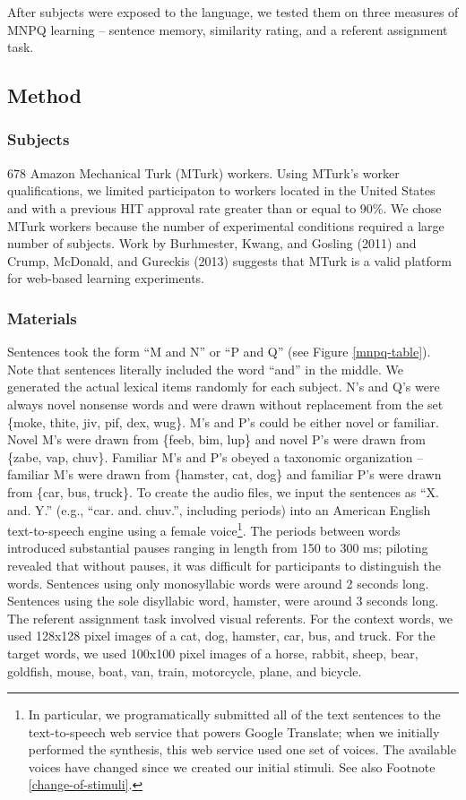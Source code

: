 \documentclass[man,floatsintext]{apa6}
\begin{document}
After subjects were exposed to the language, we tested them on three
measures of MNPQ learning -- sentence memory, similarity rating, and a
referent assignment task.

\subsection{Method}

\subsubsection{Subjects}
678 Amazon Mechanical Turk (MTurk) workers. Using MTurk's worker
qualifications, we limited participaton to workers located in the
United States and with a previous HIT approval rate greater than or
equal to 90\%. We chose MTurk workers because the number of
experimental conditions required a large number of subjects. Work by
Burhmester, Kwang, and Gosling (2011) and Crump, McDonald, and
Gureckis (2013) suggests that MTurk is a valid platform for web-based
learning experiments.

\subsubsection{Materials}
Sentences took the form ``M and N'' or ``P and Q'' (see Figure
\ref{mnpq-table}). Note that sentences literally included the word
``and'' in the middle. We generated the actual lexical items randomly
for each subject. N's and Q's were always novel nonsense words and
were drawn without replacement from the set \{moke, thite, jiv, pif,
dex, wug\}. M's and P's could be either novel or familiar. Novel M's
were drawn from \{feeb, bim, lup\} and novel P's were drawn from
\{zabe, vap, chuv\}. Familiar M's and P's obeyed a taxonomic
organization -- familiar M's were drawn from \{hamster, cat, dog\} and
familiar P's were drawn from \{car, bus, truck\}. To create the audio
files, we input the sentences as ``X. and. Y.'' (e.g.,
``car. and. chuv.'', including periods) into an American English
text-to-speech engine using a female voice\footnote{\label{tts}In
  particular, we programatically submitted all of the text sentences
  to the text-to-speech web service that powers Google Translate; when
  we initially performed the synthesis, this web service used one set
  of voices. The available voices have changed since we created our
  initial stimuli. See also Footnote \ref{change-of-stimuli}.}. The
periods between words introduced substantial pauses ranging in length
from 150 to 300 ms; piloting revealed that without pauses, it was
difficult for participants to distinguish the words. Sentences using
only monosyllabic words were around 2 seconds long. Sentences using
the sole disyllabic word, hamster, were around 3 seconds long.  The
referent assignment task involved visual referents. For the context
words, we used 128x128 pixel images of a cat, dog, hamster, car, bus,
and truck. For the target words, we used 100x100 pixel images of a
horse, rabbit, sheep, bear, goldfish, mouse, boat, van, train,
motorcycle, plane, and bicycle.
\end{document}
